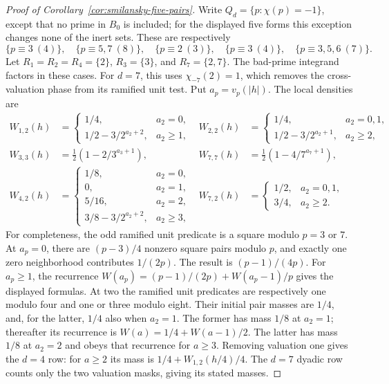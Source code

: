 \begin{proof}[Proof of Corollary~\ref{cor:smilansky-five-pairs}]
Write \(Q_d=\{p:\chi(p)=-1\}\), except that no prime in
\(B_0\) is included; for the displayed five forms this exception
changes none of the inert sets. These are respectively
\[
 \{p\equiv3\ (4)\},\quad \{p\equiv5,7\ (8)\},\quad
 \{p\equiv2\ (3)\},\quad \{p\equiv3\ (4)\},\quad
 \{p\equiv3,5,6\ (7)\}.
\]
Let \(R_1=R_2=R_4=\{2\}\), \(R_3=\{3\}\), and
\(R_7=\{2,7\}\). The bad-prime integrand factors in these
cases. For \(d=7\), this uses \(\chi_{-7}(2)=1\), which
removes the cross-valuation phase from its ramified unit test.
Put \(a_p=v_p(|h|)\). The local densities are
\begin{align*}
 W_{1,2}(h)&=\begin{cases}
  1/4,&a_2=0,\\ 1/2-3/2^{a_2+2},&a_2\ge1,
 \end{cases}
 &W_{2,2}(h)&=\begin{cases}
  1/4,&a_2=0,1,\\ 1/2-3/2^{a_2+1},&a_2\ge2,
 \end{cases}\\[2mm]
 W_{3,3}(h)&=\tfrac12(1-2/3^{a_3+1}),
 &W_{7,7}(h)&=\tfrac12(1-4/7^{a_7+1}),\\[2mm]
 W_{4,2}(h)&=\begin{cases}
  1/8,&a_2=0,\\0,&a_2=1,\\5/16,&a_2=2,\\
  3/8-3/2^{a_2+2},&a_2\ge3,
 \end{cases}
 &W_{7,2}(h)&=\begin{cases}
  1/2,&a_2=0,1,\\3/4,&a_2\ge2.
 \end{cases}
\end{align*}
For completeness, the odd ramified unit predicate is a square
modulo \(p=3\) or \(7\). At \(a_p=0\), there are
\((p-3)/4\) nonzero square pairs modulo \(p\), and exactly
one zero neighborhood contributes \(1/(2p)\). The result is
\((p-1)/(4p)\). For \(a_p\ge1\), the recurrence
\(W(a_p)=(p-1)/(2p)+W(a_p-1)/p\) gives the displayed formulas.
At two the ramified unit predicates are respectively one modulo
four and one or three modulo eight. Their initial pair masses
are \(1/4\), and, for the latter, \(1/4\) also when \(a_2=1\).
The former has mass \(1/8\) at \(a_2=1\); thereafter its
recurrence is \(W(a)=1/4+W(a-1)/2\). The latter has mass
\(1/8\) at \(a_2=2\) and obeys that recurrence for \(a\ge3\).
Removing valuation one gives the \(d=4\) row: for \(a\ge2\)
its mass is \(1/4+W_{1,2}(h/4)/4\). The \(d=7\) dyadic
row counts only the two valuation masks, giving its stated masses.


\end{proof}
